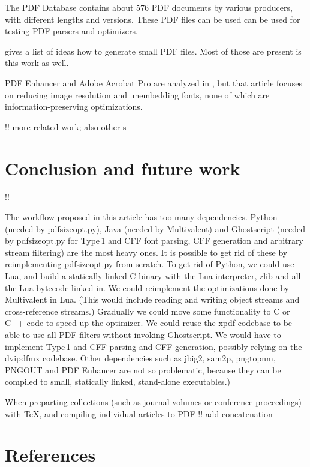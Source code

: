 \documentclass{ltugproc}
\def\cmd{\textsf}
\def\pkg{\textsf}
\begin{document}
The PDF Database \cite{pdfdb} contains about 576 PDF documents by various
producers, with different lengths and versions. These PDF files can be used
can be used for testing PDF parsers and optimizers.

\cite{pdf-bestpractices} gives a list of ideas how to generate small PDF
files. Most of those are present is this work as well.

PDF Enhancer and Adobe Acrobat Pro are analyzed in \cite{pdftweak},
but that article focuses on reducing image resolution and unembedding fonts,
none of which are information-preserving optimizations.

!! more related work; also other \cite{}s


\section{Conclusion and future work}\label{future-work}

!!

The workflow proposed in this article has too many dependencies. Python
(needed by \cmd{pdfsizeopt.py}), Java (needed by Multivalent) and
Ghostscript (needed by \cmd{pdfsizeopt.py} for Type\,1 and CFF font parsing,
CFF generation and arbitrary stream filtering) are the most heavy ones. It
is possible to get rid of these by reimplementing \cmd{pdfsizeopt.py} from
scratch. To get rid of Python, we could use Lua, and build a statically
linked C binary with the Lua interpreter, \pkg{zlib} and all the Lua bytecode
linked in. We could reimplement the optimizations done by
Multivalent in Lua. (This would include reading and writing object streams
and cross-reference streams.)
Gradually we could move some functionality to C or C++
code to speed up the optimizer. We could reuse the \cmd{xpdf} codebase to
be able to use all PDF filters without invoking Ghostscript. We would have
to implement Type\,1 and CFF parsing and CFF generation, possibly relying on
the \cmd{dvipdfmx} codebase.
Other dependencies such as \cmd{jbig2}, \cmd{sam2p}, \cmd{pngtopnm},
PNGOUT and PDF Enhancer are not so problematic, because they can be compiled
to small, statically linked, stand-alone executables.)

When preparting collections (such as journal volumes or conference
proceedings) with \TeX{}, and compiling individual articles to PDF
!! add concatenation



\section{References}
\end{document}
